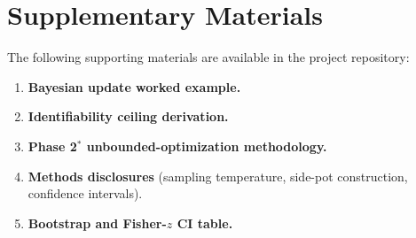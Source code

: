 \documentclass[journal,onecolumn]{IEEEtran}
\begin{document}
\section*{Supplementary Materials}
The following supporting materials are available in the project
repository:
\footnotesize\raggedright
\begin{enumerate}\setlength{\itemsep}{2pt}\setlength{\parskip}{0pt}\setlength{\leftmargini}{1.5em}
  \item \textbf{Bayesian update worked example.} 
  \item \textbf{Identifiability ceiling derivation.} 
  \item \textbf{Phase 2$^{*}$ unbounded-optimization methodology.} 
  \item \textbf{Methods disclosures} (sampling temperature, side-pot construction, confidence intervals). 
  \item \textbf{Bootstrap and Fisher-$z$ CI table.} 
\end{enumerate}
\end{document}
